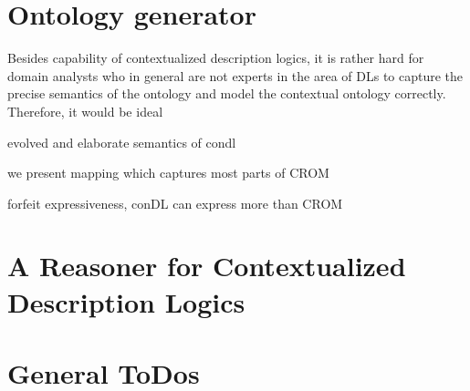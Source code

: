 
\blindtext

\section{Ontology generator}
\label{sec:zweite-section}

Besides capability of contextualized description logics, it is rather hard for domain analysts who
in general are not experts in the area of DLs to capture the precise semantics of the ontology and model the
contextual ontology correctly. Therefore, it would be ideal 

evolved and elaborate semantics of condl

we present mapping which captures most parts of CROM

forfeit expressiveness, conDL can express more than CROM


\blindtext 


\section{A Reasoner for Contextualized Description Logics}
\label{sec:intro-reasoner}


\blindtext




\clearpage

\section{General ToDos}
\label{sec:todos}





